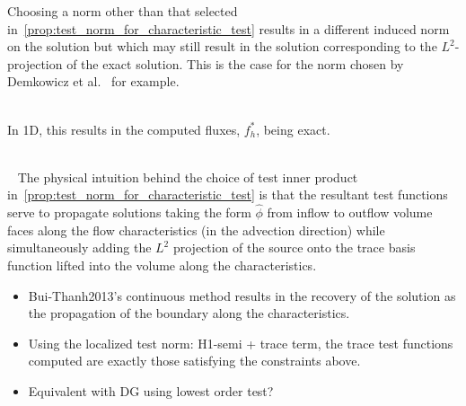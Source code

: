 \begin{remark}
Choosing a norm other than that selected in~\autoref{prop:test_norm_for_characteristic_test} results in a different
induced norm on the solution but which may still result in the solution corresponding to the $L^2$-projection of the
exact solution. This is the case for the norm chosen by Demkowicz et al.~\cite[Section ]{Demkowicz2011} for
example.
\\~

\end{remark}

\begin{remark}
In 1D, this results in the computed fluxes, $f^*_h$, being exact.
\end{remark}

\begin{remark}
\\~
The physical intuition behind the choice of test inner product in~\autoref{prop:test_norm_for_characteristic_test} is
that the resultant test functions serve to propagate solutions taking the form $\hat{\phi}$ from inflow to outflow
volume faces along the flow characteristics (in the advection direction) while simultaneously adding the $L^2$
projection of the source onto the trace basis function lifted into the volume along the characteristics. 
\end{remark}


\begin{itemize}
\item Bui-Thanh2013's continuous method results in the recovery of the solution as the propagation of the boundary along
the characteristics.
\item Using the localized test norm: H1-semi + trace term, the trace test functions computed are exactly those
satisfying the constraints above.
\item Equivalent with DG using lowest order test?
\end{itemize}


